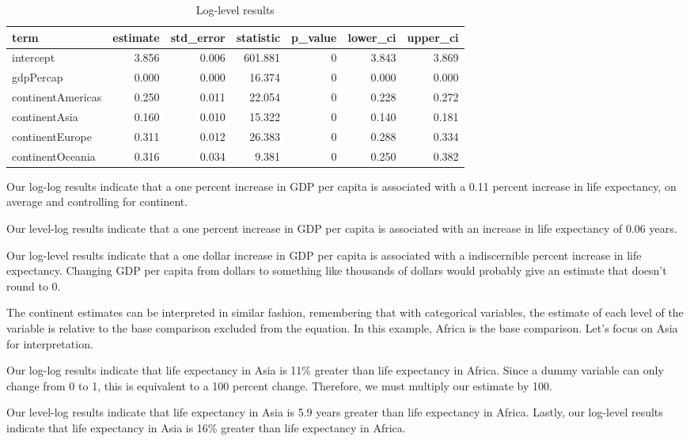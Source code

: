 \documentclass[
]{book}
\begin{document}
\begin{table}

\caption{\label{tab:loglevtab}Log-level results}
\centering
\begin{tabular}[t]{l|r|r|r|r|r|r}
\hline
term & estimate & std\_error & statistic & p\_value & lower\_ci & upper\_ci\\
\hline
intercept & 3.856 & 0.006 & 601.881 & 0 & 3.843 & 3.869\\
\hline
gdpPercap & 0.000 & 0.000 & 16.374 & 0 & 0.000 & 0.000\\
\hline
continentAmericas & 0.250 & 0.011 & 22.054 & 0 & 0.228 & 0.272\\
\hline
continentAsia & 0.160 & 0.010 & 15.322 & 0 & 0.140 & 0.181\\
\hline
continentEurope & 0.311 & 0.012 & 26.383 & 0 & 0.288 & 0.334\\
\hline
continentOceania & 0.316 & 0.034 & 9.381 & 0 & 0.250 & 0.382\\
\hline
\end{tabular}
\end{table}

Our log-log results indicate that a one percent increase in GDP per capita is associated with a 0.11 percent increase in life expectancy, on average and controlling for continent.

Our level-log results indicate that a one percent increase in GDP per capita is associated with an increase in life expectancy of 0.06 years.

Our log-level results indicate that a one dollar increase in GDP per capita is associated with a indiscernible percent increase in life expectancy. Changing GDP per capita from dollars to something like thousands of dollars would probably give an estimate that doesn't round to 0.

The continent estimates can be interpreted in similar fashion, remembering that with categorical variables, the estimate of each level of the variable is relative to the base comparison excluded from the equation. In this example, Africa is the base comparison. Let's focus on Asia for interpretation.

Our log-log results indicate that life expectancy in Asia is 11\% greater than life expectancy in Africa. Since a dummy variable can only change from 0 to 1, this is equivalent to a 100 percent change. Therefore, we must multiply our estimate by 100.

Our level-log results indicate that life expectancy in Asia is 5.9 years greater than life expectancy in Africa. Lastly, our log-level results indicate that life expectancy in Asia is 16\% greater than life expectancy in Africa.
\end{document}
